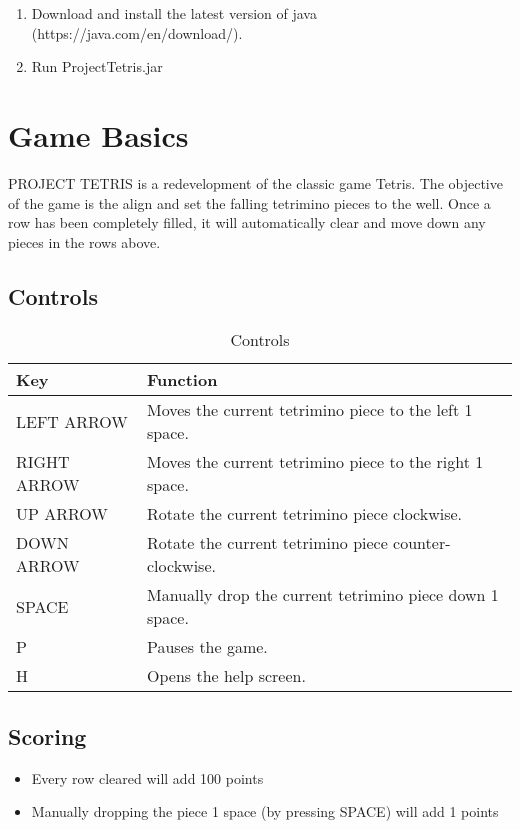 \documentclass[12pt, titlepage]{article}
\begin{document}
\begin{enumerate}
  \item Download and install the latest version of java (https://java.com/en/download/).
  \item Run ProjectTetris.jar
\end{enumerate}

\section{Game Basics}
PROJECT TETRIS is a redevelopment of the classic game Tetris. The objective of the game is the align and set the falling tetrimino pieces to the well.
Once a row has been completely filled, it will automatically clear and move down any pieces in the rows above.

\subsection{Controls}
\begin{table}[H]
\centering
\begin{tabular}{p{} p{}}
\toprule
\textbf{Key} & \textbf{Function}\\
\midrule
LEFT ARROW & Moves the current tetrimino piece to the left 1 space.\\
RIGHT ARROW & Moves the current tetrimino piece to the right 1 space.\\
UP ARROW & Rotate the current tetrimino piece clockwise.\\
DOWN ARROW & Rotate the current tetrimino piece counter-clockwise.\\
SPACE & Manually drop the current tetrimino piece down 1 space.\\
P & Pauses the game.\\
H & Opens the help screen.\\
\bottomrule
\end{tabular}
\caption{Controls}
\label{TblI}
\end{table}

\subsection{Scoring}
\begin{itemize}
  \item Every row cleared will add 100 points
  \item Manually dropping the piece 1 space (by pressing SPACE) will add 1 points
\end{itemize}
\end{document}
